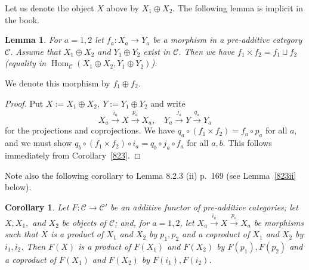 \documentclass[12pt]{article}
\newtheorem{lem}[thm]{Lemma}
\newtheorem{cor}[thm]{Corollary}
\theoremstyle{remark}
\theoremstyle{definition}
\newcommand{\C}{\mathcal C}
\newcommand{\xr}{\xrightarrow}
\DeclareMathOperator{\Hom}{Hom}%
\begin{document}
Let us denote the object $X$ above by $X_1\oplus X_2$. The following lemma is implicit in the book. 

\begin{lem}
For $a=1,2$ let $f_a:X_a\to Y_a$ be a morphism in a pre-additive category $\C$. Assume that $X_1\oplus X_2$ and $Y_1\oplus Y_2$ exist in $\C$. Then we have $f_1\times f_2=f_1\sqcup f_2$ (equality in $\Hom_\C(X_1\oplus X_2,Y_1\oplus Y_2)$). 
\end{lem} 

We denote this morphism by $f_1\oplus f_2$.\medskip 

\begin{proof}
Put $X:=X_1\oplus X_2,\ Y:=Y_1\oplus Y_2$ and write 
$$
X_a\xr{i_a}X\xr{p_a}X_a,\quad Y_a\xr{j_a}Y\xr{q_a}Y_a
$$ 
for the projections and coprojections. We have $q_a\circ(f_1\times f_2)=f_a\circ p_a$ for all $a$, and we must show $q_b\circ (f_1\times f_2)\circ i_a=q_b\circ j_a\circ f_a$ for all $a,b$. This follows immediately from Corollary~\ref{823}.
\end{proof}

Note also the following corollary to Lemma 8.2.3 (ii) p.~169 (see Lemma~\ref{823ii} below). 
%
\begin{cor}\label{823b}
Let $F:\C\to\C'$ be an additive functor of pre-additive categories; let $X,X_1,$ and $X_2$ be objects of $\C$; and, for $a=1,2$, let $X_a\xr{i_a}X\xr{p_a}X_a$ be morphisms such that $X$ is a product of $X_1$ and $X_2$ by $p_1,p_2$ and a coproduct of $X_1$ and $X_2$ by $i_1,i_2$. Then $F(X)$ is a product of $F(X_1)$ and $F(X_2)$ by $F(p_1),F(p_2)$ and a coproduct of $F(X_1)$ and $F(X_2)$ by $F(i_1),F(i_2)$. 
\end{cor}
\end{document}
